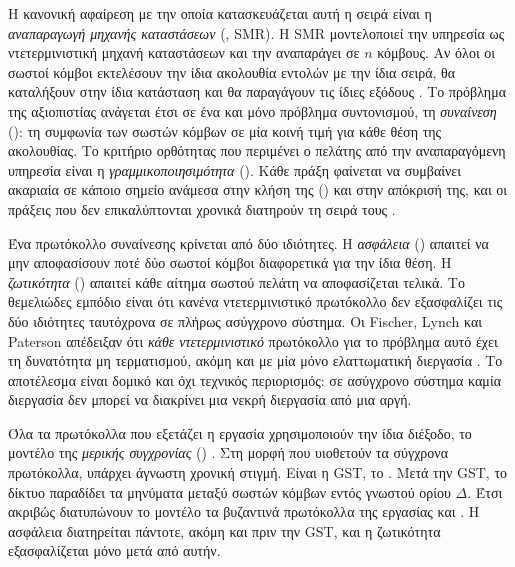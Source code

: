 Η κανονική αφαίρεση με την οποία κατασκευάζεται αυτή η σειρά είναι η
\emph{αναπαραγωγή μηχανής καταστάσεων} (,
SMR). Η SMR μοντελοποιεί την υπηρεσία ως ντετερμινιστική μηχανή
καταστάσεων και την αναπαράγει σε $n$ κόμβους. Αν όλοι οι σωστοί κόμβοι
εκτελέσουν την ίδια ακολουθία εντολών με την ίδια σειρά, θα καταλήξουν
στην ίδια κατάσταση και θα παραγάγουν τις ίδιες εξόδους
\cite{schneider1990implementing}. Το πρόβλημα της αξιοπιστίας ανάγεται
έτσι σε ένα και μόνο πρόβλημα συντονισμού, τη \emph{συναίνεση}
(): τη συμφωνία των σωστών κόμβων σε μία κοινή τιμή για
κάθε θέση της ακολουθίας. Το κριτήριο ορθότητας που περιμένει ο πελάτης
από την αναπαραγόμενη υπηρεσία είναι η \emph{γραμμικοποιησιμότητα}
(). Κάθε πράξη φαίνεται να συμβαίνει ακαριαία σε
κάποιο σημείο ανάμεσα στην κλήση της () και στην απόκρισή
της, και οι πράξεις που δεν επικαλύπτονται χρονικά διατηρούν τη σειρά
τους \cite{herlihy1990linearizability}.

Ένα πρωτόκολλο συναίνεσης κρίνεται από δύο ιδιότητες. Η \emph{ασφάλεια}
() απαιτεί να μην αποφασίσουν ποτέ δύο σωστοί κόμβοι
διαφορετικά για την ίδια θέση. Η \emph{ζωτικότητα} ()
απαιτεί κάθε αίτημα σωστού πελάτη να αποφασίζεται τελικά. Το θεμελιώδες
εμπόδιο είναι ότι κανένα ντετερμινιστικό πρωτόκολλο δεν εξασφαλίζει τις
δύο ιδιότητες ταυτόχρονα σε πλήρως ασύγχρονο σύστημα. Οι Fischer, Lynch
και Paterson απέδειξαν ότι \emph{κάθε ντετερμινιστικό} πρωτόκολλο για το
πρόβλημα αυτό έχει τη δυνατότητα μη τερματισμού, ακόμη και με μία μόνο
ελαττωματική διεργασία \cite{fischer1985impossibility}. Το αποτέλεσμα είναι δομικό και
όχι τεχνικός περιορισμός: σε ασύγχρονο σύστημα καμία διεργασία δεν μπορεί
να διακρίνει μια νεκρή διεργασία από μια αργή.

Όλα τα πρωτόκολλα που εξετάζει η εργασία χρησιμοποιούν την ίδια διέξοδο,
το μοντέλο της \emph{μερικής συγχρονίας} ()
\cite{dwork1988consensus}. Στη μορφή που υιοθετούν τα σύγχρονα
πρωτόκολλα, υπάρχει άγνωστη χρονική στιγμή. Είναι η GST, το . Μετά την GST, το δίκτυο παραδίδει τα μηνύματα μεταξύ
σωστών κόμβων εντός γνωστού ορίου $\Delta$. Έτσι ακριβώς διατυπώνουν το
μοντέλο τα βυζαντινά πρωτόκολλα της εργασίας \cite{yin2019hotstuff} και
\cite{malkhi2023hotstuff2}\prep. Η ασφάλεια διατηρείται πάντοτε, ακόμη
και πριν την GST, και η ζωτικότητα εξασφαλίζεται μόνο μετά από αυτήν.

